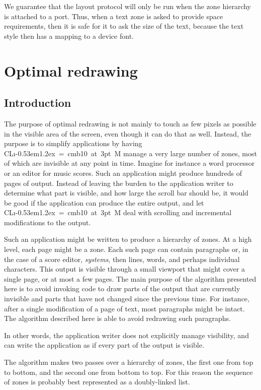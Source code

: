 \documentclass{report}
\def\Tiny{ \font\Tinyfont = cmb10 at 3pt \relax  \Tinyfont}
\def\clim{\textsf{CL{\i}\kern-0.53em\raise1.2ex\hbox{\Tiny 3}M}}
\begin{document}
We guarantee that the layout protocol will only be run when the zone
hierarchy is attached to a port.  Thus, when a text zone is asked to
provide space requirements, then it is safe for it to ask the size of
the text, because the text style then has a mapping to a device font. 

\chapter{Optimal redrawing}

\section{Introduction}

The purpose of optimal redrawing is not mainly to touch as few pixels
as possible in the visible area of the screen, even though it can do
that as well.  Instead, the purpose is to simplify applications by
having \clim{} manage a very large number of zones, most of which
are invisible at any point in time.  Imagine for instance a word
processor or an editor for music scores.  Such an application might
produce hundreds of pages of output.  Instead of leaving the burden to
the application writer to determine what part is visible, and how
large the scroll bar should be, it would be good if the application
can produce the entire output, and let \clim{} deal with scrolling and
incremental modifications to the output.  

Such an application might be written to produce a hierarchy of
zones.  At a high level, each page might be a zone.  Each such
page can contain paragraphs or, in the case of a score editor,
\emph{systems}, then lines, words, and perhaps individual characters.
This output is visible through a small viewport that might cover a
single page, or at most a few pages.  The main purpose of the
algorithm presented here is to avoid invoking code to draw parts of
the output that are currently invisible and parts that have not changed
since the previous time.  For instance, after a single modification of
a page of text, most paragraphs might be intact.  The algorithm
described here is able to avoid redrawing such paragraphs. 

In other words, the application writer does not explicitly manage
visibility, and can write the application as if every part of the
output is visible.

The algorithm makes two passes over a hierarchy of zones, the first
one from top to bottom, and the second one from bottom to top.  For
this reason the sequence of zones is probably best represented as a
doubly-linked list.
\end{document}
